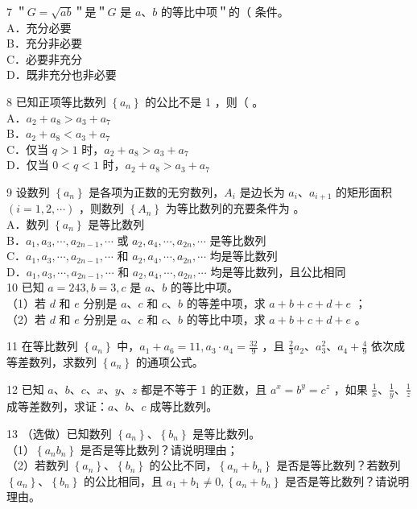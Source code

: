 \documentclass[10pt]{article}
\begin{document}
7 ＂\(G=\sqrt{a b}\)＂是＂\(G\) 是 \(a 、 b\) 的等比中项＂的（ 条件。\\
A．充分必要\\
B．充分非必要\\
C．必要非充分\\
D．既非充分也非必要

8 已知正项等比数列 \(\left\{a_{n}\right\}\) 的公比不是 1 ，则（ 。\\
A．\(a_{2}+a_{8}>a_{3}+a_{7}\)\\
B．\(a_{2}+a_{8}<a_{3}+a_{7}\)\\
C．仅当 \(q>1\) 时，\(a_{2}+a_{8}>a_{3}+a_{7}\)\\
D．仅当 \(0<q<1\) 时，\(a_{2}+a_{8}>a_{3}+a_{7}\)

9 设数列 \(\left\{a_{n}\right\}\) 是各项为正数的无穷数列，\(A_{i}\) 是边长为 \(a_{i} 、 a_{i+1}\) 的矩形面积 \((i=1,2, \cdots)\) ，则数列 \(\left\{A_{n}\right\}\) 为等比数列的充要条件为 。\\
A．数列 \(\left\{a_{n}\right\}\) 是等比数列\\
B．\(a_{1}, a_{3}, \cdots, a_{2 n-1}, \cdots\) 或 \(a_{2}, a_{4}, \cdots, a_{2 n}, \cdots\) 是等比数列\\
C．\(a_{1}, a_{3}, \cdots, a_{2 n-1}, \cdots\) 和 \(a_{2}, a_{4}, \cdots, a_{2 n}, \cdots\) 均是等比数列\\
D．\(a_{1}, a_{3}, \cdots, a_{2 n-1}, \cdots\) 和 \(a_{2}, a_{4}, \cdots, a_{2 n}, \cdots\) 均是等比数列，且公比相同\\
10 已知 \(a=243, b=3, c\) 是 \(a 、 b\) 的等比中项。\\
（1）若 \(d\) 和 \(e\) 分别是 \(a 、 c\) 和 \(c 、 b\) 的等差中项，求 \(a+b+c+d+e\) ；\\
（2）若 \(d\) 和 \(e\) 分别是 \(a 、 c\) 和 \(c 、 b\) 的等比中项，求 \(a+b+c+d+e\) 。

11 在等比数列 \(\left\{a_{n}\right\}\) 中，\(a_{1}+a_{6}=11, a_{3} \cdot a_{4}=\frac{32}{9}\) ，且 \(\frac{2}{3} a_{2} 、 a_{3}^{2} 、 a_{4}+\frac{4}{9}\) 依次成等差数列，求数列 \(\left\{a_{n}\right\}\) 的通项公式。

12 已知 \(a 、 b 、 c 、 x 、 y 、 z\) 都是不等于 1 的正数，且 \(a^{x}=b^{y}=c^{z}\) ，如果 \(\frac{1}{x} 、 \frac{1}{y} 、 \frac{1}{z}\) 成等差数列，求证：\(a 、 b 、 c\) 成等比数列。

13 （选做）已知数列 \(\left\{a_{n}\right\} 、\left\{b_{n}\right\}\) 是等比数列。\\
（1）\(\left\{a_{n} b_{n}\right\}\) 是否是等比数列？请说明理由；\\
（2）若数列 \(\left\{a_{n}\right\} 、\left\{b_{n}\right\}\) 的公比不同，\(\left\{a_{n}+b_{n}\right\}\) 是否是等比数列？若数列 \(\left\{a_{n}\right\} 、\left\{b_{n}\right\}\) 的公比相同，且 \(a_{1}+b_{1} \neq 0,\left\{a_{n}+b_{n}\right\}\) 是否是等比数列？请说明理由。
\end{document}
